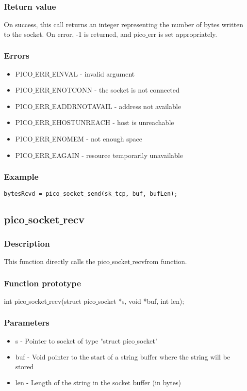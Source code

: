 \subsubsection*{Return value}
On success, this call returns an integer representing the number of bytes written to
the socket. On error, -1 is returned, and pico$\_$err is set appropriately.

\subsubsection*{Errors}
\begin{itemize}
\item PICO$\_$ERR$\_$EINVAL - invalid argument
\item PICO$\_$ERR$\_$ENOTCONN - the socket is not connected
\item PICO$\_$ERR$\_$EADDRNOTAVAIL - address not available
\item PICO$\_$ERR$\_$EHOSTUNREACH - host is unreachable
\item PICO$\_$ERR$\_$ENOMEM - not enough space
\item PICO$\_$ERR$\_$EAGAIN - resource temporarily unavailable
\end{itemize}

\subsubsection*{Example}
\begin{verbatim}
bytesRcvd = pico_socket_send(sk_tcp, buf, bufLen);
\end{verbatim}


\subsection{pico$\_$socket$\_$recv}

\subsubsection*{Description}
This function directly calls the pico$\_$socket$\_$recvfrom function.

\subsubsection*{Function prototype}
int pico$\_$socket$\_$recv(struct pico$\_$socket *s, void *buf, int len);

\subsubsection*{Parameters}
\begin{itemize}
\item s - Pointer to socket of type "struct pico$\_$socket"
\item buf - Void pointer to the start of a string buffer where the string will be stored
\item len - Length of the string in the socket buffer (in bytes)
\end{itemize}

